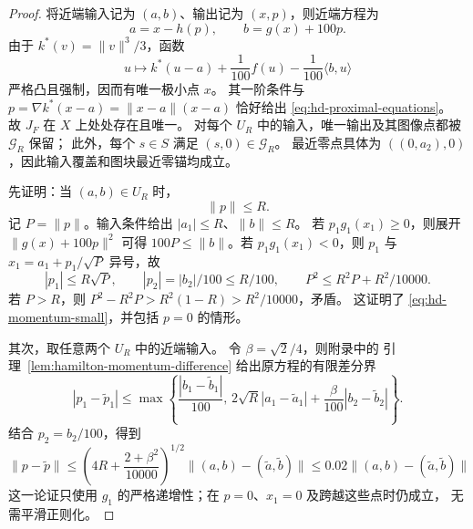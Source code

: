 \begin{proof}
将近端输入记为 $(a,b)$、输出记为 $(x,p)$，则近端方程为
\begin{equation}
\label{eq:hd-proximal-equations}
 a=x-h(p),\qquad b=g(x)+100p.
\end{equation}
由于 $k^*(v)=\|v\|^3/3$，函数
\[
 u\longmapsto k^*(u-a)+\frac1{100}f(u)
                         -\frac1{100}\langle b,u\rangle
\]
严格凸且强制，因而有唯一极小点 $x$。
其一阶条件与 $p=\nabla k^*(x-a)=\|x-a\|(x-a)$
恰好给出 \eqref{eq:hd-proximal-equations}。
故 $J_F$ 在 $X$ 上处处存在且唯一。
对每个 $U_R$ 中的输入，唯一输出及其图像点都被 $\mathcal G_R$ 保留；
此外，每个 $s\in S$ 满足 $(s,0)\in\mathcal G_R$。
最近零点具体为 $((0,a_2),0)$，因此输入覆盖和图块最近零锚均成立。

先证明：当 $(a,b)\in U_R$ 时，
\begin{equation}
\label{eq:hd-momentum-small}
 \|p\|\leq R.
\end{equation}
记 $P=\|p\|$。输入条件给出 $|a_1|\leq R$、$\|b\|\leq R$。
若 $p_1g_1(x_1)\geq0$，则展开 $\|g(x)+100p\|^2$ 可得
$100P\leq\|b\|$。若 $p_1g_1(x_1)<0$，则
$p_1$ 与 $x_1=a_1+p_1/\sqrt P$ 异号，故
\[
 |p_1|\leq R\sqrt P,\qquad |p_2|=|b_2|/100\leq R/100,
 \qquad P^2\leq R^2P+R^2/10000.
\]
若 $P>R$，则 $P^2-R^2P>R^2(1-R)>R^2/10000$，矛盾。
这证明了 \eqref{eq:hd-momentum-small}，并包括 $p=0$ 的情形。

其次，取任意两个 $U_R$ 中的近端输入。
令 $\beta=\sqrt2/4$，则附录中的
引理~\ref{lem:hamilton-momentum-difference} 给出原方程的有限差分界
\[
 |p_1-\widetilde p_1|
 \leq\max\left\{
       \frac{|b_1-\widetilde b_1|}{100},\,
       2\sqrt R|a_1-\widetilde a_1|
       +\frac{\beta}{100}|b_2-\widetilde b_2|
      \right\}.
\]
结合 $p_2=b_2/100$，得到
\begin{equation}
\label{eq:hd-momentum-lipschitz}
 \|p-\widetilde p\|
 \leq\left(4R+\frac{2+\beta^2}{10000}\right)^{1/2}
        \|(a,b)-(\widetilde a,\widetilde b)\|
 \leq0.02\|(a,b)-(\widetilde a,\widetilde b)\|
\end{equation}
这一论证只使用 $g_1$
的严格递增性；在 $p=0$、$x_1=0$ 及跨越这些点时仍成立，
无需平滑正则化。


\end{proof}
